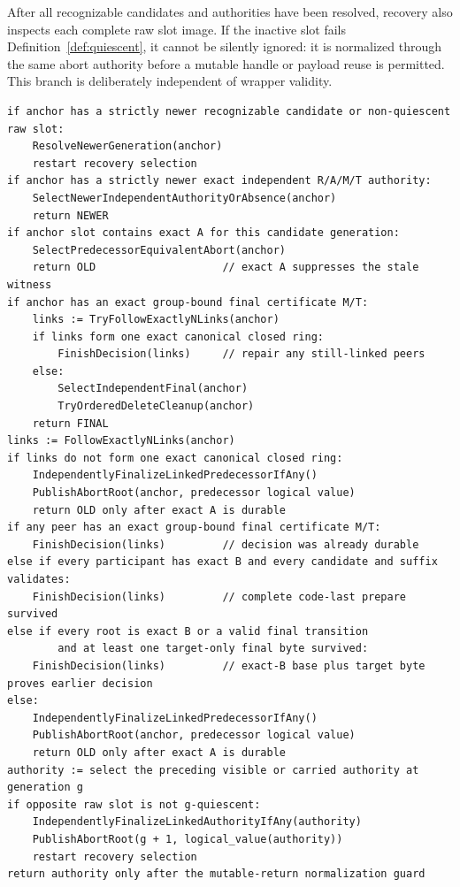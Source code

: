 \documentclass[10pt,twocolumn]{article}
\theoremstyle{remark}
\begin{document}
After all recognizable candidates and authorities have been resolved, recovery also inspects each
complete raw slot image. If the inactive slot fails Definition~\ref{def:quiescent}, it cannot be
silently ignored: it is normalized through the same abort authority before a mutable
handle or payload reuse is permitted. This branch is deliberately independent of wrapper validity.

\begin{lstlisting}[style=protocol,caption={Recover from one intact witness.}]
if anchor has a strictly newer recognizable candidate or non-quiescent raw slot:
    ResolveNewerGeneration(anchor)
    restart recovery selection
if anchor has a strictly newer exact independent R/A/M/T authority:
    SelectNewerIndependentAuthorityOrAbsence(anchor)
    return NEWER
if anchor slot contains exact A for this candidate generation:
    SelectPredecessorEquivalentAbort(anchor)
    return OLD                    // exact A suppresses the stale witness
if anchor has an exact group-bound final certificate M/T:
    links := TryFollowExactlyNLinks(anchor)
    if links form one exact canonical closed ring:
        FinishDecision(links)     // repair any still-linked peers
    else:
        SelectIndependentFinal(anchor)
        TryOrderedDeleteCleanup(anchor)
    return FINAL
links := FollowExactlyNLinks(anchor)
if links do not form one exact canonical closed ring:
    IndependentlyFinalizeLinkedPredecessorIfAny()
    PublishAbortRoot(anchor, predecessor logical value)
    return OLD only after exact A is durable
if any peer has an exact group-bound final certificate M/T:
    FinishDecision(links)         // decision was already durable
else if every participant has exact B and every candidate and suffix validates:
    FinishDecision(links)         // complete code-last prepare survived
else if every root is exact B or a valid final transition
        and at least one target-only final byte survived:
    FinishDecision(links)         // exact-B base plus target byte proves earlier decision
else:
    IndependentlyFinalizeLinkedPredecessorIfAny()
    PublishAbortRoot(anchor, predecessor logical value)
    return OLD only after exact A is durable
authority := select the preceding visible or carried authority at generation g
if opposite raw slot is not g-quiescent:
    IndependentlyFinalizeLinkedAuthorityIfAny(authority)
    PublishAbortRoot(g + 1, logical_value(authority))
    restart recovery selection
return authority only after the mutable-return normalization guard
\end{lstlisting}
\end{document}
